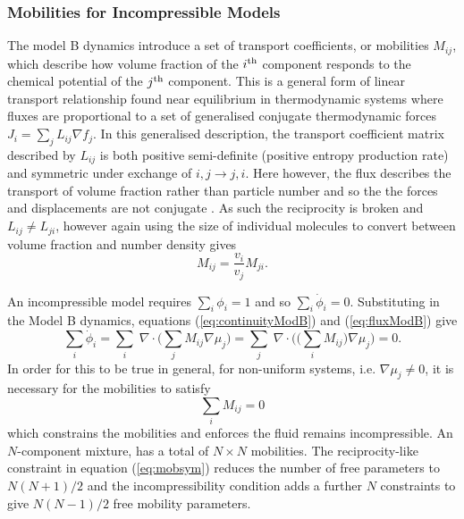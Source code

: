 \subsubsection{Mobilities for Incompressible Models} \label{subsec:mob}

The model B dynamics introduce a set of transport coefficients, or mobilities $M_{ij}$, which describe how volume fraction of the $i\textsuperscript{th}$ component responds to the chemical potential of the $j\textsuperscript{th}$ component. This is a general form of linear transport relationship found near equilibrium in thermodynamic systems where fluxes are proportional to a set of generalised conjugate thermodynamic forces $J_i = \sum_{j}L_{ij}\nabla f_{j}$. In this generalised description, the transport coefficient matrix described by $L_{ij}$ is both positive semi-definite (positive entropy production rate) and symmetric under exchange of $i, j \rightarrow j, i$. Here however, the flux describes the transport of volume fraction rather than particle number and so the the forces and displacements are not conjugate \cite{groot_non-equilibrium_1984}. As such the reciprocity is broken and $L_{ij} \neq L_{ji}$, however again using the size of individual molecules to convert between volume fraction and number density gives
\begin{equation}
    {M}_{ij} = \frac{v_i}{v_j}{M}_{ji}.
    \label{eq:mobsym}
\end{equation}

An incompressible model requires $\sum_i\phi_i = 1$ and so $\sum_i\dot{\phi}_i = 0$. Substituting in the Model B dynamics, equations (\ref{eq:continuityModB}) and (\ref{eq:fluxModB}) give
\begin{equation}
    \sum_i\dot{\phi}_i = \sum_i\;\nabla\cdot\bigg(\sum_j M_{ij}\nabla\mu_j\bigg) = \sum_j\;\nabla\cdot\bigg(\big(\sum_i M_{ij}\big)\nabla\mu_j\bigg) = 0.
\end{equation}
In order for this to be true in general, for non-uniform systems, i.e. $\nabla\mu_j \neq 0$, it is necessary for the mobilities to satisfy
\begin{equation}
    \sum_i M_{ij} = 0
    \label{eq:mobinc}
\end{equation}
which constrains the mobilities and enforces the fluid remains incompressible.\cite{kehr_mobility_1989} An $N$-component mixture,  has a total of $N\times N$ mobilities. The reciprocity-like constraint in equation (\ref{eq:mobsym}) reduces the number of free parameters to $N(N+1)/2$ and the incompressibility condition adds a further $N$ constraints to give $N(N-1)/2$ free mobility parameters.

